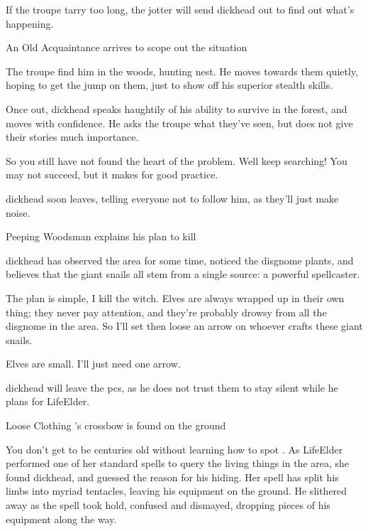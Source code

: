 
If the troupe tarry too long, the \gls{jotter} will send \gls{dickhead} out to find out what's happening.

{An Old Acquaintance}%
{ arrives to scope out the situation}%

The troupe find him in the woods, hunting  nest.
He moves towards them quietly, hoping to get the jump on them, just to show off his superior stealth skills.

Once out, \gls{dickhead} speaks haughtily of his ability to survive in the forest, and moves with confidence.
He asks the troupe what they've seen, but does not give their stories much importance.

\begin{speechtext}
  So you still have not found the heart of the problem.
  Well keep searching!
  You may not succeed, but it makes for good practice.
\end{speechtext}

\Gls{dickhead} soon leaves, telling everyone not to follow him, as they'll just make noise.

{Peeping Woodsman}%
{ explains his plan to kill }%

\Gls{dickhead} has observed the area for some time, noticed the \gls{disgnome} plants, and believes that the giant snails all stem from a single source: a powerful spellcaster.

\begin{speechtext}
  The plan is simple, I kill the \gls{witch}.
  Elves are always wrapped up in their own thing; they never pay attention, and they're probably drowsy from all the \gls{disgnome} in the area.
  So I'll set  then loose an arrow on whoever crafts these giant snails.

  Elves are small.
  I'll just need one arrow.
\end{speechtext}

\Gls{dickhead} will leave the \glspl{pc}, as he does not trust them to stay silent while he plans  for \gls{LifeElder}.

{Loose Clothing}%
{'s crossbow is found on the ground}%

\begin{exampletext}
  You don't get to be centuries old without learning how to spot .
  As \gls{LifeElder} performed one of her standard spells to query the living things in the area, she found \gls{dickhead}, and guessed the reason for his hiding.
  Her spell has split his limbs into myriad tentacles, leaving his equipment on the ground.
  He slithered away as the spell took hold, confused and dismayed, dropping pieces of his equipment along the way.
\end{exampletext}


